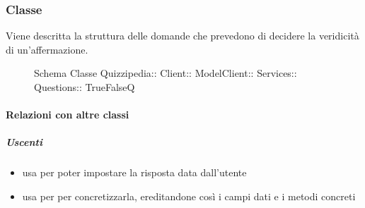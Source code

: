\subsubsection{Classe }
Viene descritta la struttura delle domande che prevedono di decidere la veridicità di un'affermazione.
\begin{figure}[H]
\centering
\noindent{}
\caption[Schema Classe TrueFalseQ]{Schema Classe Quizzipedia:: Client:: ModelClient:: Services:: Questions:: TrueFalseQ}
\end{figure}
\paragraph{Relazioni con altre classi}
\subparagraph{Uscenti}
\begin{itemize}
\item usa  per poter impostare la risposta data dall'utente
\item usa  per per concretizzarla, ereditandone così i campi dati e i metodi concreti
\end{itemize}
